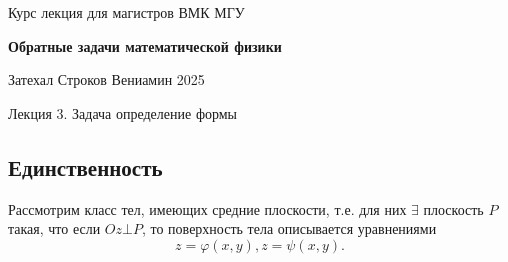 \documentclass{article}
\begin{document}
\centerline{\large Курс лекция для магистров ВМК МГУ}
\centerline {\textbf{\LARGE Обратные задачи математической физики}}
\centerline {Затехал Строков Вениамин 2025}

\vspace{0.4cm}

\centerline{\LARGE Лекция 3. Задача определение формы}

\vspace{0.5cm}
\subsection*{Единственность}

Рассмотрим класс тел, имеющих средние плоскости, т.е. для них $\exists$ плоскость $P$ такая, что если $Oz \bot P$, то поверхность тела описывается уравнениями
\begin{equation*}
	z = \varphi(x,y), z = \psi(x,y).
\end{equation*}
\end{document}

